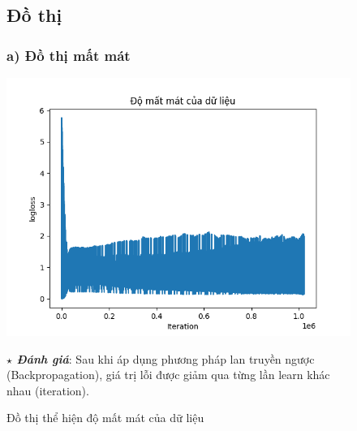\documentclass{report}
\begin{document}
        \begin{center}
            \begin{figure}[htp]
            \fontsize{15}{10}\selectfont
            \subsection{Đồ thị}
                \fontsize{14}{10}\selectfont
                \subsubsection{a) Đồ thị mất mát}
                \begin{center}
                    \includegraphics[scale = 0.7]{image/plot_loss_mlp.png}
                    \caption{Đồ thị thể hiện độ mất mát của dữ liệu}
                \end{center}
                \fontsize{13}{10}\selectfont \textbf{$\star$\textit{ Đánh giá}}: Sau khi áp dụng phương pháp lan truyền ngược (Backpropagation), giá trị lỗi được giảm qua từng lần learn khác nhau (iteration).
            \end{figure}
        \end{center}
        
\end{document}
